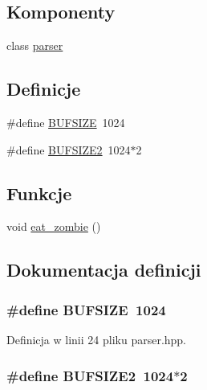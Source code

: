 \subsection*{Komponenty}
\begin{CompactItemize}
\item 
class \hyperlink{a00005}{parser}
\end{CompactItemize}
\subsection*{Definicje}
\begin{CompactItemize}
\item 
\#define \hyperlink{a00015_eca034f67218340ecb2261a22c2f3dcd}{BUFSIZE}~1024
\item 
\#define \hyperlink{a00015_b46db07bcc5d1bb3dbc73f7be2592ee0}{BUFSIZE2}~1024$\ast$2
\end{CompactItemize}
\subsection*{Funkcje}
\begin{CompactItemize}
\item 
void \hyperlink{a00015_6c724feff242ad0cd599cdd458f73199}{eat\_\-zombie} ()
\end{CompactItemize}


\subsection{Dokumentacja definicji}
\hypertarget{a00015_eca034f67218340ecb2261a22c2f3dcd}{
\subsubsection[{BUFSIZE}]{\setlength{\rightskip}{0pt plus 5cm}\#define BUFSIZE~1024}}
\label{dd/d1b/a00015_eca034f67218340ecb2261a22c2f3dcd}




Definicja w linii 24 pliku parser.hpp.\hypertarget{a00015_b46db07bcc5d1bb3dbc73f7be2592ee0}{
\subsubsection[{BUFSIZE2}]{\setlength{\rightskip}{0pt plus 5cm}\#define BUFSIZE2~1024$\ast$2}}
\label{dd/d1b/a00015_b46db07bcc5d1bb3dbc73f7be2592ee0}




